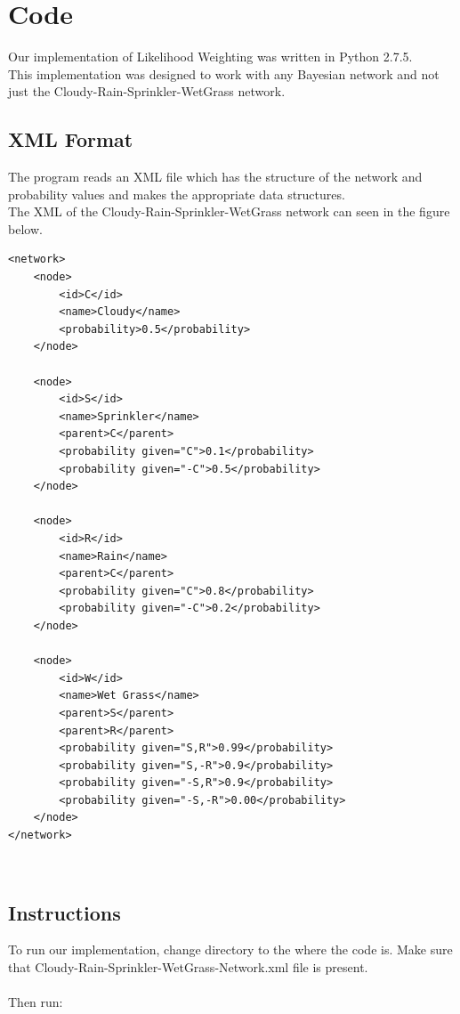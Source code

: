 \documentclass{article}
\begin{document}
\section{Code}
Our implementation of Likelihood Weighting was written in Python 2.7.5.\\

This implementation was designed to work with any Bayesian network and not just the Cloudy-Rain-Sprinkler-WetGrass network.

\subsection{XML Format}
The program reads an XML file which has the structure of the network and probability values and makes the appropriate data structures.\\

The XML of the Cloudy-Rain-Sprinkler-WetGrass network can seen in the figure below.

\begin{minipage}{\linewidth}
\begin{lstlisting}
<network>
	<node>
		<id>C</id>
		<name>Cloudy</name>
		<probability>0.5</probability>
	</node>

	<node>
		<id>S</id>
		<name>Sprinkler</name>
		<parent>C</parent>
		<probability given="C">0.1</probability>
		<probability given="-C">0.5</probability>
	</node>
	
	<node>
		<id>R</id>
		<name>Rain</name>
		<parent>C</parent>
		<probability given="C">0.8</probability>
		<probability given="-C">0.2</probability>
	</node>
	
	<node>
		<id>W</id>
		<name>Wet Grass</name>
		<parent>S</parent>
		<parent>R</parent>
		<probability given="S,R">0.99</probability>
		<probability given="S,-R">0.9</probability>
		<probability given="-S,R">0.9</probability>
		<probability given="-S,-R">0.00</probability>
	</node>
</network>
\end{lstlisting}
\end{minipage}\\

\subsection{Instructions}
To run our implementation, change directory to the where the code is. Make sure that Cloudy-Rain-Sprinkler-WetGrass-Network.xml file is present.\\
\\
Then run:
\end{document}
